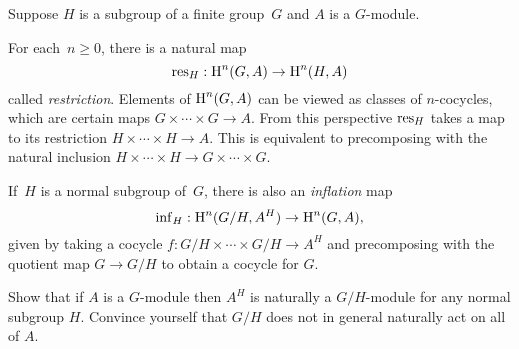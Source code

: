 Suppose $H$ is a subgroup of a finite group~$G$ and $A$
is a $G$-module.

For each~$n\geq 0$, there is a natural map
$$
	\operatorname{res}_H : \operatorname{H}^n(G,A) \to \operatorname{H}^n(H,A)
$$
called \emph{restriction}. Elements of $\operatorname{H}^n(G,A)$ can be
viewed as classes of $n$-cocycles, which are certain maps
$G \times \cdots \times G \to A$. From this perspective $\operatorname{res}_H$
takes a map to its restriction $H \times \cdots \times H \to A$.
This is equivalent to precomposing with the natural inclusion
$H\times\cdots\times H \to G\times\cdots\times G$.

If~$H$ is a normal subgroup of~$G$, there is also an \emph{inflation} map
$$
	\operatorname{inf}_H: \operatorname{H}^n(G/H, A^H) \to \operatorname{H}^n(G,A),
$$
given by taking a cocycle $f : G/H \times \cdots \times G/H \to A^H$
and precomposing with the quotient map $G\to G/H$ to
obtain a cocycle for $G$.

\begin{exercise}
	Show that if $A$ is a $G$-module then
	$A^H$ is naturally a $G/H$-module for
	any normal subgroup $H$. Convince yourself
	that $G/H$ does not in general naturally
	act on all of $A$.
\end{exercise}

